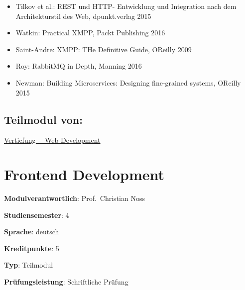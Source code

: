\begin{itemize}
\tightlist
\item
  Tilkov et al.: REST und HTTP- Entwicklung und Integration nach dem
  Architekturstil des Web, dpunkt.verlag 2015
\item
  Watkin: Practical XMPP, Packt Publishing 2016
\item
  Saint-Andre: XMPP: THe Definitive Guide, OReilly 2009
\item
  Roy: RabbitMQ in Depth, Manning 2016
\item
  Newman: Building Microservices: Designing fine-grained systems,
  OReilly 2015
\end{itemize}

\hypertarget{teilmodul-vonpathlabelmi-2017modulbeschreibungen-bachelorba_wd_frameworks-daten-und-dienste}{%
\section*{Teilmodul
von:\label{/mi-2017/modulbeschreibungen-bachelor/BA_WD_Frameworks-daten-und-dienste}}\label{teilmodul-vonpathlabelmi-2017modulbeschreibungen-bachelorba_wd_frameworks-daten-und-dienste}}

\hyperref[/mi-2017/modulbeschreibungen-bachelor/BA_Vertiefung-Web_Development]{Vertiefung – Web Development}

\hypertarget{frontend-developmentpathlabelmi-2017modulbeschreibungen-bachelorba_wd_frontend-development}{%
\chapter{Frontend
Development\label{/mi-2017/modulbeschreibungen-bachelor/BA_WD_Frontend-Development}}\label{frontend-developmentpathlabelmi-2017modulbeschreibungen-bachelorba_wd_frontend-development}}

\begin{modulHead}
\textbf{Modulverantwortlich}: Prof.~Christian
Noss
\end{modulHead}
\begin{modulHead}
\textbf{Studiensemester}:
4
\end{modulHead}
\begin{modulHead}
\textbf{Sprache}:
deutsch
\end{modulHead}
\begin{modulHead}
\textbf{Kreditpunkte}:
5
\end{modulHead}
\begin{modulHead}
\textbf{Typ}:
Teilmodul
\end{modulHead}
\begin{modulHead}
\textbf{Prüfungsleistung}:
Schriftliche Prüfung
\end{modulHead}


